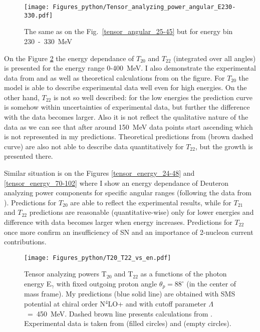     \begin{figure}[h]
        \begin{center}
        \texttt{[image: Figures\_python/Tensor\_analyzing\_power\_angular\_E230-330.pdf]}
        \end{center}
        \caption{The same as on the Fig.~\ref*{tensor_angular_25-45} but for energy bin 230~-~330~MeV}
        \label{tensor_angular_230-330}
    \end{figure}
        


    On the Figure \ref{T20_vs_en} the energy dependance of $T_{20}$ and $T_{22}$
    (integrated over all angles)
    is presented for the energy range 0-400~MeV. I also demonstrate the experimental data from
    \cite{rachek2007} and \cite{mishev1993} as well as theoretical calculations from \cite{Schmitt1989}
    on the figure. For $T_{20}$ the model is able to describe experimental data well even for
    high energies. On the other hand, $T_{22}$ is not so well described: for the low 
    energies the prediction curve is somehow within uncertainties of experimental data,
    but further the difference with the data becomes larger. Also it is not 
    reflect the qualitative nature of the data as we can see that after around 150~MeV
    data points start ascending which is not represented in my predictions.
    Theoretical predictions from \cite{Schmitt1989} (brown dashed curve) are also not able
    to describe data quantitatively for $T_{22}$, but the growth is presented there. 

    Similar situation is on the Figures \ref{tensor_energy_24-48} and \ref{tensor_energy_70-102}
    where I show an energy dependance of Deuteron analyzing power components for 
    specific angular ranges (following the data from \cite{rachek2007}).
    Predictions for $T_{20}$ are able to reflect the experimental results,
    while for $T_{21}$ and $T_{22}$ predictions are reasonable (quantitative-wise) 
    only for lower energies and difference with data becomes larger
    when energy increases. Predictions for $T_{22}$ once more 
    confirm an insufficiency of SN and an importance of
    2-nucleon current contributions. 
    

    \begin{figure}[h]
        \begin{center}
        \texttt{[image: Figures\_python/T20\_T22\_vs\_en.pdf]}
        \end{center}
        \caption{Tensor analyzing powers T$_{20}$ and T$_{22}$ as a functions of the photon energy E$_\gamma$
        with fixed outgoing proton angle $\theta_p = 88^{\circ}$ (in the center of mass frame).
        My predictions (blue solid line) are obtained with SMS potential at chiral order N$^4$LO+
        and with cutoff parameter $\Lambda$~=~450~MeV.
        Dashed brown line presents calculations from \cite{Schmitt1989}.
        Experimental data is taken from \cite{rachek2007} (filled circles)
        and \cite{mishev1993} (empty circles).}
        \label{T20_vs_en}
    \end{figure}

